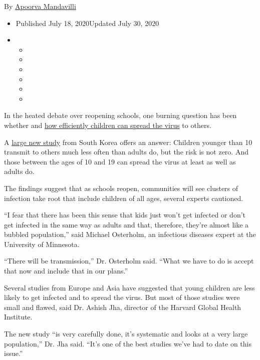 By
\href{https://www.nytimes3xbfgragh.onion/by/apoorva-mandavilli}{Apoorva
Mandavilli}

\begin{itemize}
\item
  Published July 18, 2020Updated July 30, 2020
\item
  \begin{itemize}
  \item
  \item
  \item
  \item
  \item
  \item
  \end{itemize}
\end{itemize}

In the heated debate over reopening schools, one burning question has
been whether and
\href{https://www.nytimes3xbfgragh.onion/2020/07/30/health/coronavirus-children.html}{how
efficiently children can spread the virus} to others.

A \href{https://wwwnc.cdc.gov/eid/article/26/10/20-1315_article}{large
new study} from South Korea offers an answer: Children younger than 10
transmit to others much less often than adults do, but the risk is not
zero. And those between the ages of 10 and 19 can spread the virus at
least as well as adults do.

The findings suggest that as schools reopen, communities will see
clusters of infection take root that include children of all ages,
several experts cautioned.

``I fear that there has been this sense that kids just won't get
infected or don't get infected in the same way as adults and that,
therefore, they're almost like a bubbled population,'' said Michael
Osterholm, an infectious diseases expert at the University of Minnesota.

``There will be transmission,'' Dr. Osterholm said. ``What we have to do
is accept that now and include that in our plans.''

Several studies from Europe and Asia have suggested that young children
are less likely to get infected and to spread the virus. But most of
those studies were small and flawed, said Dr. Ashish Jha, director of
the Harvard Global Health Institute.

The new study ``is very carefully done, it's systematic and looks at a
very large population,'' Dr. Jha said. ``It's one of the best studies
we've had to date on this issue.''

